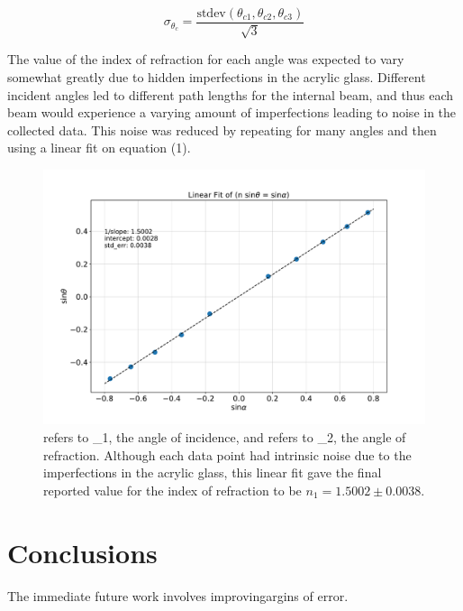 \documentclass[colorlinks=true,pdfstartview=FitV,linkcolor=blue,
            citecolor=red,urlcolor=magenta]{basedoc}
\begin{document}
  \begin{equation} \label{eq:sigma_theta_c}
      \sigma_{\theta_c} = \frac {\text{stdev}(\theta_{c1}, \theta_{c2}, \theta_{c3})} {\sqrt{3}}
  \end{equation}



  The value of the index of refraction for each angle was expected to vary somewhat greatly due to hidden imperfections in the acrylic glass. Different incident angles led to different path lengths for the internal beam, and thus each beam would experience a varying amount of imperfections leading to noise in the collected data. This noise was reduced by repeating for many angles and then using a linear fit on equation (1).

  \begin{figure}[!h]
    \begin{center}
    \includegraphics[width=6in]{resources/LinearFit.pdf}
    \caption{\theta refers to \theta_1, the angle of incidence, and \alpha refers to \theta_2, the angle of refraction. Although each data point had intrinsic noise due to the imperfections in the acrylic glass, this linear fit gave the final reported value for the index of refraction to be $n_1 = 1.5002 \pm 0.0038$.}
    \label{fig:lin_fit_snell}
    \end{center}
  \end{figure}

\section{Conclusions}
  The immediate future work involves improvingargins of error.
\end{document}
